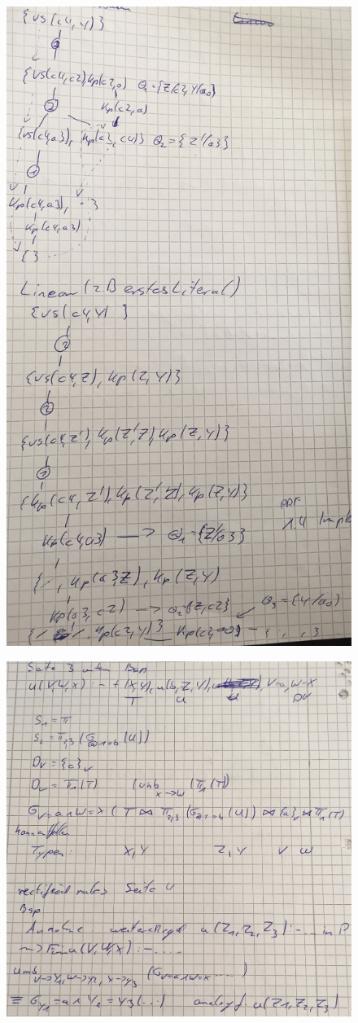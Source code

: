 \documentclass[12pt, a4paper]{article}
\begin{document}
\begin{itemize}
\begin{figure}
\centering
\includegraphics[width=0.7\linewidth]{img/img10}
\caption{}
\label{fig:img10}
\end{figure}
\begin{figure}
\centering
\includegraphics[width=0.7\linewidth]{img/img11}
\caption{}
\label{fig:img11}
\end{figure}
\end{itemize}
\end{document}
